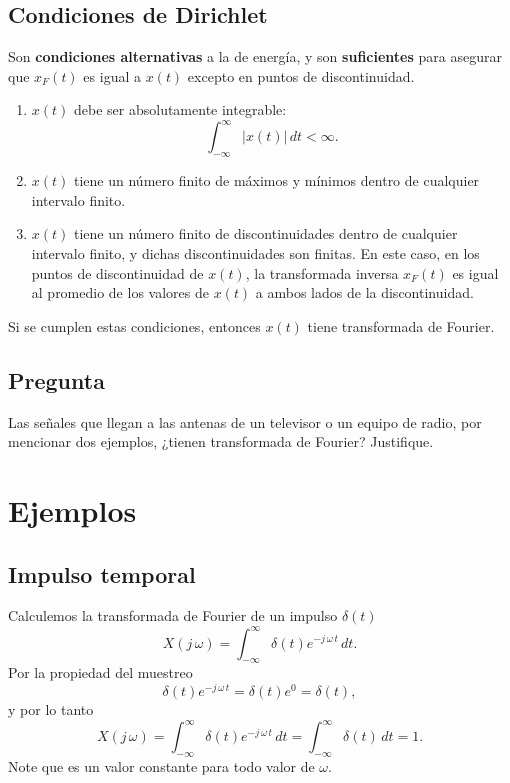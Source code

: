 \subsection{Condiciones de Dirichlet}

Son \textbf{condiciones alternativas} a la de energía, y son \textbf{suficientes} para asegurar que $x_{F}(t)$ es igual a $x(t)$ excepto en puntos de discontinuidad.
\begin{enumerate}
	\item $x(t)$ debe ser absolutamente integrable:
	\begin{equation}
		\int_{-\infty}^{\infty} |x(t)| \, dt < \infty .
	\end{equation}
	
	\item $x(t)$ tiene un número finito de máximos y mínimos dentro de cualquier intervalo finito.
	\item $x(t)$ tiene un número finito de discontinuidades dentro de cualquier intervalo finito, y dichas discontinuidades son finitas. En este caso, en los puntos de discontinuidad de $x(t)$, la transformada inversa $x_{F}(t)$ es igual al promedio de los valores de $x(t)$ a ambos lados de la discontinuidad.
\end{enumerate}
Si se cumplen estas condiciones, entonces $x(t)$ tiene transformada de Fourier.

\subsection{Pregunta}

Las señales que llegan a las antenas de un televisor o un equipo de radio, por mencionar dos ejemplos, ¿tienen transformada de Fourier? Justifique.

\section{Ejemplos}

\subsection{Impulso temporal}

Calculemos la transformada de Fourier de un impulso $\delta(t)$
\begin{equation}
	X(j \, \omega) = \int_{-\infty}^{\infty} \delta(t) e^{-j \, \omega \, t} \, dt.
\end{equation}
Por la propiedad del muestreo 
\begin{equation}
	\delta(t) e^{-j \, \omega \, t} = \delta(t) e^{0} = \delta(t) ,
\end{equation}
y por lo tanto 
\begin{equation}
	X(j \, \omega) = \int_{-\infty}^{\infty} \delta(t) e^{-j \, \omega \, t} \, dt = \int_{-\infty}^{\infty} \delta(t) \, dt = 1.
\end{equation}
Note que es un valor constante para todo valor de $\omega.$

